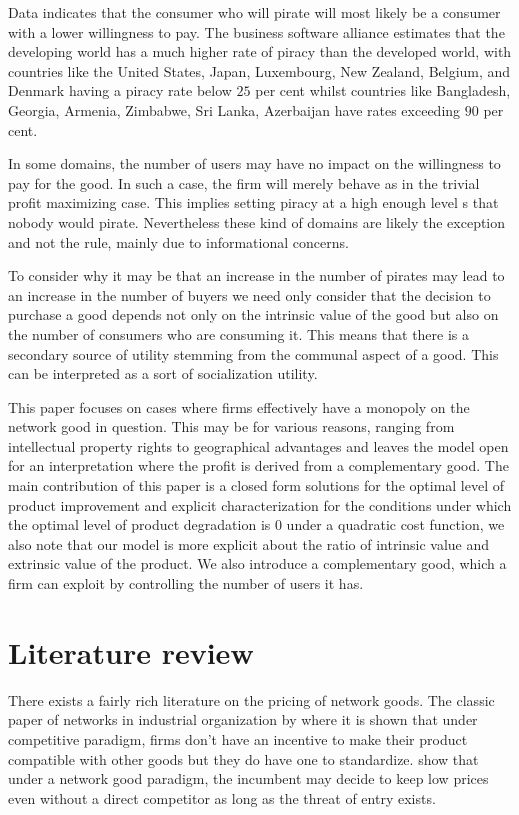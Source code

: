 \documentclass{article}
\begin{document}
Data indicates that the consumer who will pirate will most likely be a consumer with a lower willingness to pay. The business software alliance estimates that the developing world has a much higher rate of piracy than the developed world, with countries like the United States, Japan, Luxembourg, New Zealand, Belgium, and Denmark  having a piracy rate below $25$ per cent whilst countries like Bangladesh, Georgia, Armenia, Zimbabwe, Sri Lanka, Azerbaijan have rates exceeding $90$ per cent. \citep{BSA09}

In some domains, the number of users may have no impact on the willingness to pay for the good. In such a case, the firm will merely behave as in the trivial profit maximizing case. This implies setting piracy at a high enough level s that nobody would pirate. Nevertheless these kind of domains are likely the exception and not the rule, mainly due to informational concerns. 

To consider why it may be that an increase in the number of pirates may lead to an increase in the number of buyers we need only consider that the decision to purchase a good depends not only on the intrinsic value of the good but also on the number of consumers who are consuming it. This means that there is a secondary source of utility stemming from the communal aspect of a good. This can be interpreted as a sort of socialization utility.

This paper focuses on cases where firms effectively have a monopoly on the network good in question. This may be for various reasons, ranging from intellectual property rights to geographical advantages and leaves the model open for an interpretation where the profit is derived from a complementary good. The main contribution of this paper is a closed form solutions for the optimal level of product improvement and explicit characterization for the conditions under which the optimal level of product degradation is 0 under a quadratic cost function, we also note that our model is more explicit about the ratio of intrinsic value and extrinsic value of the product. We also introduce a complementary good, which a firm can exploit by controlling the number of users it has.

\section{Literature review}

There exists a fairly rich literature on the pricing of network goods. The classic paper of networks in industrial organization by \citep{KS86} where it is shown that under  competitive paradigm, firms don't have an incentive to make their product compatible with other goods but they do have one to standardize. \cite{FT00} show that under a network good paradigm, the incumbent may decide to keep low prices even without a direct competitor as long as the threat of entry exists. 
\end{document}
